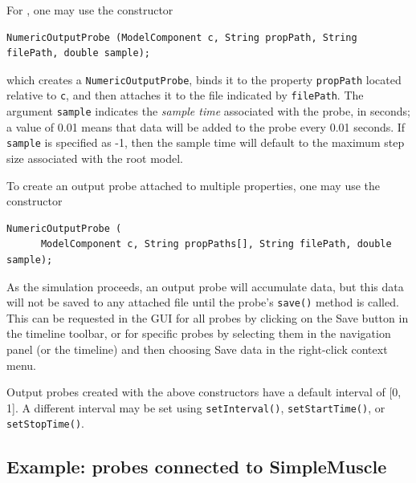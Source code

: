 For , one may use
the constructor
%
\begin{lstlisting}[]
   NumericOutputProbe (ModelComponent c, String propPath, String filePath, double sample);
\end{lstlisting}
%
which creates a {\tt NumericOutputProbe}, binds it to the property
{\tt propPath} located relative to {\tt c}, and then attaches it to
the file indicated by {\tt filePath}. The argument {\tt sample}
indicates the {\it sample time} associated with the probe, in seconds;
a value of 0.01 means that data will be added to the probe every 0.01
seconds.  If {\tt sample} is specified as -1, then the sample time
will default to the maximum step size associated with the root model.

To create an output probe attached to multiple properties, one may use the
constructor
%
\begin{lstlisting}[]
   NumericOutputProbe (
      ModelComponent c, String propPaths[], String filePath, double sample);
\end{lstlisting}
%

\begin{sideblock}
As the simulation proceeds, an output probe will accumulate data, but
this data will not be saved to any attached file until the probe's
{\tt save()} method is called. This can be requested in the GUI for
all probes by clicking on the {\sf Save} button in the timeline
toolbar, or for specific probes by selecting them in the navigation
panel (or the timeline) and then choosing {\sf Save data} in the
right-click context menu.
\end{sideblock}

Output probes created with the above constructors have a default
interval of [0, 1]. A different interval may be set using
{\tt setInterval()}, {\tt setStartTime()}, or {\tt setStopTime()}.

\subsection{Example: probes connected to SimpleMuscle}
\label{SimpleMuscleWithProbes:sec}

